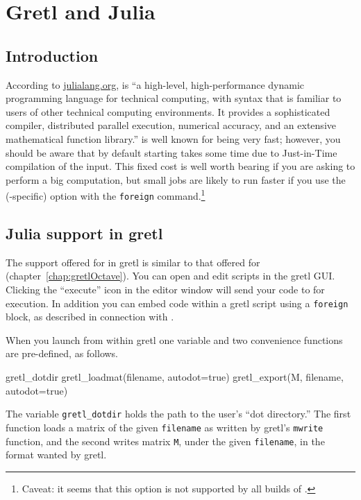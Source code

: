 \chapter{Gretl and Julia}
\label{chap:gretlJulia}

\section{Introduction}
\label{Julia-intro}

According to \url{julialang.org},  is ``a high-level,
high-performance dynamic programming language for technical computing,
with syntax that is familiar to users of other technical computing
environments. It provides a sophisticated compiler, distributed
parallel execution, numerical accuracy, and an extensive mathematical
function library.''  is well known for being very fast;
however, you should be aware that by default starting 
takes some time due to Just-in-Time compilation of the input. This
fixed cost is well worth bearing if you are asking  to
perform a big computation, but small jobs are likely to run faster if
you use the (-specific)  option with the
\texttt{foreign} command.\footnote{Caveat: it seems that this option
  is not supported by all builds of .}

\section{Julia support in gretl}
\label{sec:Julia-support}

The support offered for  in gretl is similar to that
offered for  (chapter~\ref{chap:gretlOctave}). You can
open and edit  scripts in the gretl GUI.  Clicking
the ``execute'' icon in the editor window will send your code to
 for execution. In addition you can embed 
code within a gretl script using a \texttt{foreign} block, as
described in connection with .

When you launch  from within gretl one variable and
two convenience functions are pre-defined, as follows.
\begin{code}
gretl_dotdir
gretl_loadmat(filename, autodot=true)
gretl_export(M, filename, autodot=true)
\end{code}
The variable \verb|gretl_dotdir| holds the path to the user's ``dot
directory.''  The first function loads a matrix of the given
\texttt{filename} as written by gretl's \texttt{mwrite}
function, and the second writes matrix \texttt{M}, under the given
\texttt{filename}, in the format wanted by gretl.

